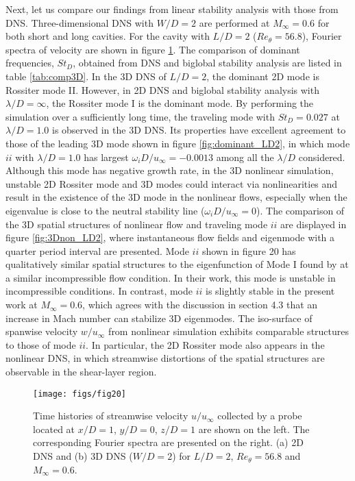 \documentclass{jfm}
\begin{document}
Next, let us compare our findings from linear stability analysis with those from DNS. Three-dimensional DNS with $W/D=2$ are performed at $M_\infty=0.6$ for both short and long cavities. For the cavity with $L/D=2$ ($Re_\theta=56.8$), Fourier spectra of velocity are shown in figure \ref{fig:3DFFT}. The comparison of dominant frequencies, $St_D$, obtained from DNS and biglobal stability analysis are listed in table \ref{tab:comp3D}. In the 3D DNS of $L/D=2$, the dominant 2D mode is Rossiter mode II. However, in 2D DNS and biglobal stability analysis with $\lambda/D=\infty$, the Rossiter mode I is the dominant mode. By performing the simulation over a sufficiently long time, the traveling mode with $St_D=0.027$ at $\lambda/D=1.0$ is observed in the 3D DNS. Its properties have excellent agreement to those of the leading 3D mode shown in figure \ref{fig:dominant_LD2}, in which mode $ii$ with $\lambda/D=1.0$ has largest $\omega_iD/u_\infty=-0.0013$ among all the $\lambda/D$ considered. Although this mode has negative growth rate, in the 3D nonlinear simulation, unstable 2D Rossiter mode and 3D modes could interact via nonlinearities and result in the existence of the 3D mode in the nonlinear flows, especially when the eigenvalue is close to the neutral stability line ($\omega_i D/u_\infty=0$). The comparison of the 3D spatial structures of nonlinear flow and traveling mode $ii$ are displayed in figure \ref{fig:3Dnon_LD2}, where instantaneous flow fields and eigenmode with a quarter period interval are presented. Mode $ii$ shown in figure 20 has qualitatively similar spatial structures to the eigenfunction of Mode I found by \cite{Garrido:JFM14} at a similar incompressible flow condition. In their work, this mode is unstable in incompressible conditions. In contrast, mode $ii$ is slightly stable in the present work at $M_\infty=0.6$, which agrees with the discussion in section 4.3 that an increase in Mach number can stabilize 3D eigenmodes. The iso-surface of spanwise velocity $w/u_\infty$ from nonlinear simulation exhibits comparable structures to those of mode $ii$. In particular, the 2D Rossiter mode also appears in the nonlinear DNS, in which streamwise distortions of the spatial structures are observable in the shear-layer region.

\begin{figure}
\begin{center}
   \texttt{[image: figs/fig20]}
\end{center}
\caption{Time histories of streamwise velocity $u/u_\infty$ collected by a probe located at $x/D = 1$, $y/D = 0$, $z/D = 1$ are shown on the left. The corresponding Fourier spectra are presented on the right. (a) 2D DNS and (b) 3D DNS ($W/D=2$) for $L/D=2$, $Re_\theta=56.8$ and $M_\infty=0.6$.}
\label{fig:3DFFT}
\end{figure}
\end{document}
